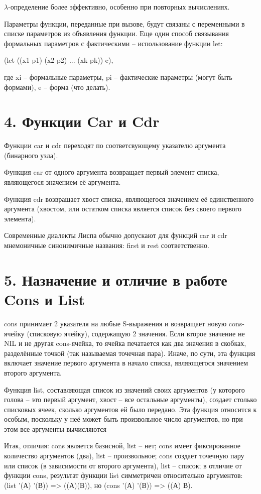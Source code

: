 \documentclass[12pt]{report}
\begin{document}
$\lambda$-определение более эффективно, особенно при повторных вычислениях. 

Параметры функции, переданные при вызове, будут связаны с переменными в списке параметров из объявления функции. Еще один способ связывания формальных параметров с фактическими -- использование функции let:

(let ((x1 p1) (x2 p2) ... (xk pk))  e),

где xi -- формальные параметры, pi -- фактические параметры (могут быть формами), e -- форма (что делать).

\section*{4. Функции Car и Cdr}

Функции car и cdr переходят по соответсвующему указателю аргумента (бинарного узла).

Функция car от одного аргумента возвращает первый элемент списка, являющегося значением её аргумента. 

Функция cdr возвращает хвост списка, являющегося значением её единственного аргумента (хвостом, или остатком списка является список  без своего первого элемента).  

Современные диалекты  Лиспа обычно допускают для функций car и cdr мнемоничные синонимичные названия: first и rest соответственно.

\section*{5. Назначение и отличие в работе Cons и List}

cons принимает 2 указателя на любые S-выражения и возвращает новую cons-ячейку (списковую ячейку), содержащую 2 значения. Если второе значение не NIL и не другая cons-ячейка, то ячейка печатается как два значения в скобках, разделённые точкой (так называемая точечная пара). Иначе, по сути, эта функция включает значение первого аргумента в начало списка, являющегося значением второго аргумента. 

Функция list, составляющая список из значений своих аргументов (у которого голова -- это первый аргумент, хвост -- все остальные аргументы), создает столько списковых ячеек, сколько аргументов ей было передано. Эта функция относится к особым, поскольку у неё может быть произвольное число аргументов, но при этом все аргументы вычисляются

Итак, отличия: cons является базисной, list -- нет; cons имеет  фиксированное количество аргументов (два), list -- произвольное; cons создает точечную пару или список (в зависимости от второго аргумента), list -- список; в отличие от функции cons, результат функции list симметричен относительно аргументов: (list '(А) '(В)) => ((А)(В)), но (cons '(А) '(В)) => ((А) В).
\end{document}

